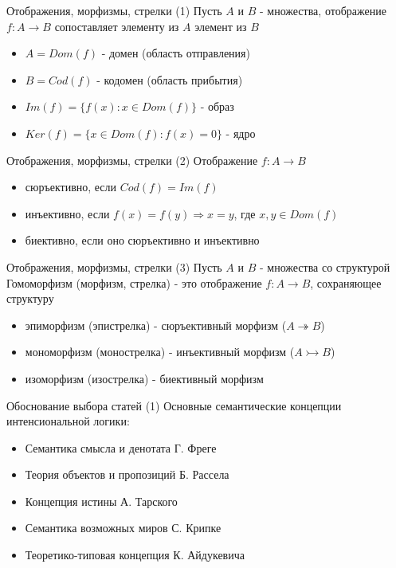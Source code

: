 \documentclass{beamer}
\begin{document}
\begin{frame}{Отображения, морфизмы, стрелки (1)}
Пусть $A$ и $B$ - множества, отображение $f : A \to B$ сопоставляет элементу из $A$ элемент из $B$\\
  \begin{itemize}
    \item $A = Dom(f)$ - домен (область отправления)
    \item $B = Cod(f)$ - кодомен (область прибытия) 
    \item $Im(f) = \{f(x) : x \in Dom(f)\}$ - образ 
    \item $Ker(f) = \{x \in Dom(f) : f(x) = 0\}$ - ядро 
  \end{itemize}
\end{frame}

\begin{frame}{Отображения, морфизмы, стрелки (2)}
Отображение $f : A \to B$
  \begin{itemize}
    \item сюръективно, если $Cod(f) = Im(f)$
    \item инъективно, если $f(x) = f(y) \Rightarrow x = y$, где $x, y \in Dom(f)$
    \item биективно, если оно сюръективно и инъективно
  \end{itemize}
\end{frame}

\begin{frame}{Отображения, морфизмы, стрелки (3)}
Пусть $A$ и $B$ - множества со структурой\\ \bigskip
Гомоморфизм (морфизм, стрелка) - это отображение $f : A \to B$, сохраняющее структуру\\
  \begin{itemize}
    \item эпиморфизм (эпистрелка) - сюръективный морфизм ($A \twoheadrightarrow B$)
    \item мономорфизм (монострелка) - инъективный морфизм ($A \rightarrowtail B$)
    \item изоморфизм (изострелка) - биективный морфизм 
  \end{itemize}
\end{frame}


\begin{frame}{Обоснование выбора статей (1)}
Основные семантические концепции интенсиональной логики:\\
  \begin{itemize}
    \item Семантика смысла и денотата Г. Фреге
    \item Теория объектов и пропозиций Б. Рассела
    \item Концепция истины А. Тарского
    \item Семантика возможных миров С. Крипке
    \item Теоретико-типовая концепция К. Айдукевича
  \end{itemize}
\end{frame}
\end{document}
